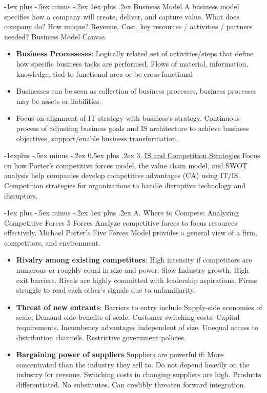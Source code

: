 \documentclass[12pt, landscape]{article}
\makeatletter
\renewcommand{\subsection}{\@startsection{subsection}{2}{0mm}%
                                {-1explus -.5ex minus -.2ex}%
                                {0.5ex plus .2ex}%
                                {\normalfont\normalsize\bfseries}}
\renewcommand{\subsubsection}{\@startsection{subsubsection}{3}{0mm}%
                                {-1ex plus -.5ex minus -.2ex}%
                                {1ex plus .2ex}%
                                {\normalfont\small\bfseries}}
\makeatother
\begin{document}
\begin{multicols*}{3}
\subsubsection{Business Model}
 A business model specifies how a company will create, deliver, and capture value. What does company do? How unique? Revenue, Cost, key resources / activities / partners needed? Business Model Canvas.
\begin{itemize}
\item \textbf{Business Processeses}:  Logically related set of activities/steps that define how specific business tasks are performed. Flows of material, information, knowledge, tied to functional area or be cross-functional
\item Businesses can be seen as collection of business processes, business processes may be assets or liabilities.
\item Focus on alignment of IT strategy with business’s strategy. Continuous process of adjusting business goals and IS architecture to achieve business objectives, support/enable business transformation.
\end{itemize}

\subsection{3. \underline{IS and Competition Strategies}}
Focus on how Porter’s competitive forces model, the value chain model, and SWOT analysis help companies develop competitive advantages (CA) using IT/IS. Competition strategies for organizations to handle disruptive 
technology and disruptors.

\subsubsection{A. Where to Compete: Analyzing Competitive Forces 5 Forces}
Analyze competitive forces to focus resources effectively. Michael Porter’s Five Forces Model provides a general view of a firm, competitors, and environment. 
\begin{itemize}
    \item \textbf{Rivalry among existing competitors}: High intensity if competitors are numerous or roughly equal in size and power. Slow Industry growth, High exit barriers.  Rivals are highly committed with leadership aspirations.  Firms struggle to read each other's signals due to unfamiliarity.  
    \item \textbf{Threat of new entrants}: Barriers to entry include Supply-side economies of scale, Demand-side benefits of scale. Customer switching costs. Capital requirements. Incumbency advantages independent of size. Unequal access to distribution channels. Restrictive government policies.  
    \item \textbf{Bargaining power of suppliers}  Suppliers are powerful if:  
            More concentrated than the industry they sell to.  
            Do not depend heavily on the industry for revenue.  
            Switching costs in changing suppliers are high.  
            Products differentiated.  
            No substitutes.  
            Can credibly threaten forward integration.  


\end{itemize}
\end{multicols*}
\end{document}
